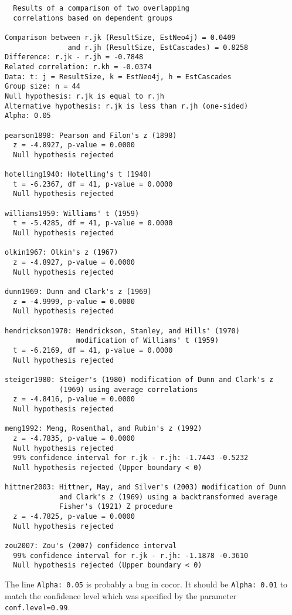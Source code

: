 \begin{verbatim}
  Results of a comparison of two overlapping
  correlations based on dependent groups

Comparison between r.jk (ResultSize, EstNeo4j) = 0.0409
               and r.jh (ResultSize, EstCascades) = 0.8258
Difference: r.jk - r.jh = -0.7848
Related correlation: r.kh = -0.0374
Data: t: j = ResultSize, k = EstNeo4j, h = EstCascades
Group size: n = 44
Null hypothesis: r.jk is equal to r.jh
Alternative hypothesis: r.jk is less than r.jh (one-sided)
Alpha: 0.05

pearson1898: Pearson and Filon's z (1898)
  z = -4.8927, p-value = 0.0000
  Null hypothesis rejected

hotelling1940: Hotelling's t (1940)
  t = -6.2367, df = 41, p-value = 0.0000
  Null hypothesis rejected

williams1959: Williams' t (1959)
  t = -5.4285, df = 41, p-value = 0.0000
  Null hypothesis rejected

olkin1967: Olkin's z (1967)
  z = -4.8927, p-value = 0.0000
  Null hypothesis rejected

dunn1969: Dunn and Clark's z (1969)
  z = -4.9999, p-value = 0.0000
  Null hypothesis rejected

hendrickson1970: Hendrickson, Stanley, and Hills' (1970)
                 modification of Williams' t (1959)
  t = -6.2169, df = 41, p-value = 0.0000
  Null hypothesis rejected

steiger1980: Steiger's (1980) modification of Dunn and Clark's z
             (1969) using average correlations
  z = -4.8416, p-value = 0.0000
  Null hypothesis rejected

meng1992: Meng, Rosenthal, and Rubin's z (1992)
  z = -4.7835, p-value = 0.0000
  Null hypothesis rejected
  99% confidence interval for r.jk - r.jh: -1.7443 -0.5232
  Null hypothesis rejected (Upper boundary < 0)

hittner2003: Hittner, May, and Silver's (2003) modification of Dunn
             and Clark's z (1969) using a backtransformed average
             Fisher's (1921) Z procedure
  z = -4.7825, p-value = 0.0000
  Null hypothesis rejected

zou2007: Zou's (2007) confidence interval
  99% confidence interval for r.jk - r.jh: -1.1878 -0.3610
  Null hypothesis rejected (Upper boundary < 0)
\end{verbatim}

The line \texttt{Alpha: 0.05} is probably a bug in cocor. It should be
\texttt{Alpha: 0.01} to match the confidence level which was specified by the
parameter \texttt{conf.level=0.99}.
